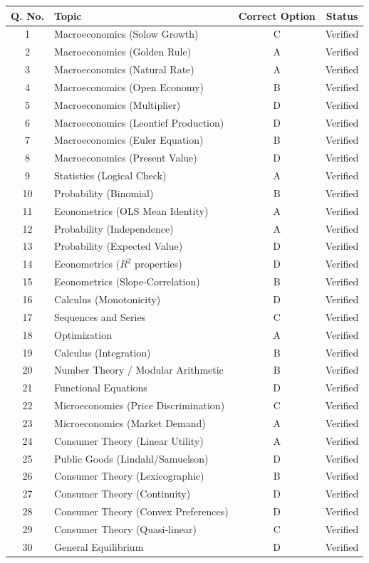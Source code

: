 \documentclass[11pt]{article}
\begin{document}
\begin{center}
\begin{longtable}{c l c c}
\toprule
Q. No. & Topic & Correct Option & Status \\
\midrule
\endhead
1  & Macroeconomics (Solow Growth)        & C & Verified \\
2  & Macroeconomics (Golden Rule)         & A & Verified \\
3  & Macroeconomics (Natural Rate)        & A & Verified \\
4  & Macroeconomics (Open Economy)        & B & Verified \\
5  & Macroeconomics (Multiplier)          & D & Verified \\
6  & Macroeconomics (Leontief Production) & D & Verified \\
7  & Macroeconomics (Euler Equation)      & B & Verified \\
8  & Macroeconomics (Present Value)       & D & Verified \\
9  & Statistics (Logical Check)           & A & Verified \\
10 & Probability (Binomial)               & B & Verified \\
11 & Econometrics (OLS Mean Identity)     & A & Verified \\
12 & Probability (Independence)           & A & Verified \\
13 & Probability (Expected Value)         & D & Verified \\
14 & Econometrics ($R^2$ properties)      & D & Verified \\
15 & Econometrics (Slope-Correlation)     & B & Verified \\
16 & Calculus (Monotonicity)              & D & Verified \\
17 & Sequences and Series                 & C & Verified \\
18 & Optimization                         & A & Verified \\
19 & Calculus (Integration)               & B & Verified \\
20 & Number Theory / Modular Arithmetic   & B & Verified \\
21 & Functional Equations                 & D & Verified \\
22 & Microeconomics (Price Discrimination)& C & Verified \\
23 & Microeconomics (Market Demand)       & A & Verified \\
24 & Consumer Theory (Linear Utility)     & A & Verified \\
25 & Public Goods (Lindahl/Samuelson)     & D & Verified \\
26 & Consumer Theory (Lexicographic)      & B & Verified \\
27 & Consumer Theory (Continuity)         & D & Verified \\
28 & Consumer Theory (Convex Preferences) & D & Verified \\
29 & Consumer Theory (Quasi-linear)       & C & Verified \\
30 & General Equilibrium                  & D & Verified \\
\bottomrule
\end{longtable}
\end{center}
\end{document}
